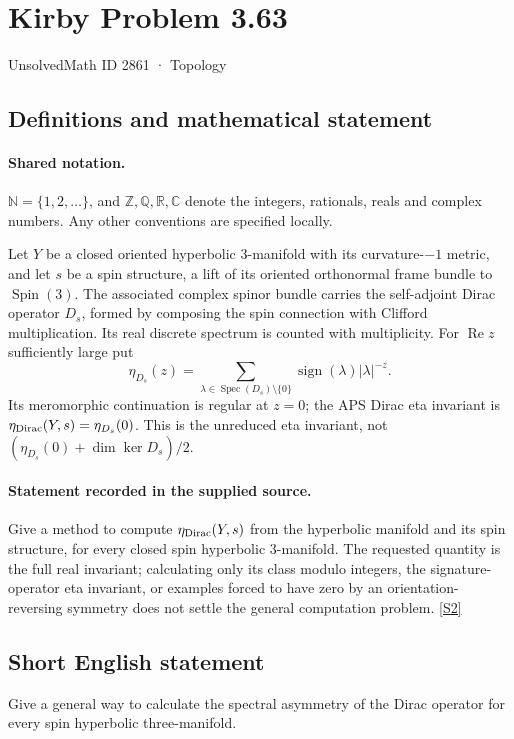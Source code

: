 \documentclass[11pt]{article}
\newcommand{\sref}[2]{\hyperlink{source:#1:#2}{[S#2]}}
\begin{document}
\setcounter{section}{2860}
\section{Kirby Problem 3.63}\label{2861}
{\small\sffamily UnsolvedMath ID 2861 · Topology}
\subsection{Definitions and mathematical statement}

\paragraph{Shared notation.}$\mathbb N=\{1,2,\ldots\}$, and $\mathbb Z,\mathbb Q,\mathbb R,\mathbb C$ denote the integers, rationals, reals and complex numbers. Any other conventions are specified locally.


Let $Y$ be a closed oriented hyperbolic $3$-manifold with its curvature-$-1$ metric, and let $s$ be a spin structure, a lift of its oriented orthonormal frame bundle to $\operatorname{Spin}(3)$. The associated complex spinor bundle carries the self-adjoint Dirac operator $D_s$, formed by composing the spin connection with Clifford multiplication. Its real discrete spectrum is counted with multiplicity. For $\operatorname{Re}z$ sufficiently large put
\[
\eta_{D_s}(z)=\sum_{\lambda\in\operatorname{Spec}(D_s)\setminus\{0\}}
\operatorname{sign}(\lambda)|\lambda|^{-z}.
\]
Its meromorphic continuation is regular at $z=0$; the APS Dirac eta invariant is $\eta_{\rm Dirac}(Y,s)=\eta_{D_s}(0)$. This is the unreduced eta invariant, not $(\eta_{D_s}(0)+\dim\ker D_s)/2$.
\paragraph{Statement recorded in the supplied source.}
Give a method to compute $\eta_{\rm Dirac}(Y,s)$ from the hyperbolic manifold and its spin structure, for every closed spin hyperbolic $3$-manifold. The requested quantity is the full real invariant; calculating only its class modulo integers, the signature-operator eta invariant, or examples forced to have zero by an orientation-reversing symmetry does not settle the general computation problem. \sref{2861}{2}
\subsection{Short English statement}
Give a general way to calculate the spectral asymmetry of the Dirac operator for every spin hyperbolic three-manifold.
\end{document}
